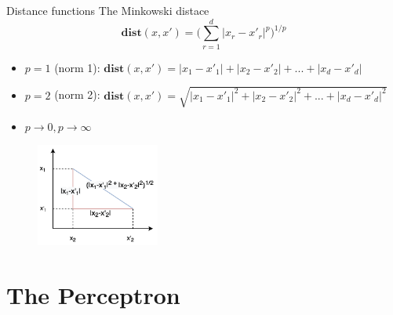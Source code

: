 \documentclass[aspectratio=1610]{beamer}
\begin{document}
\begin{frame}{Distance functions}
    The Minkowski distace
    $$\textbf{dist}(x,x') = \Bigg(\sum_{r=1}^{d}|x_r - x'_r|^p\Bigg)^{1/p}$$
  \begin{itemize}
      \item $p = 1$ (norm 1): $\textbf{dist}(x,x') = |x_1 - x'_1| + |x_2 - x'_2| + ... + |x_d - x'_d|$
      
      \item $p = 2$ (norm 2): $\textbf{dist}(x,x') = \sqrt{|x_1 - x'_1|^2 + |x_2 - x'_2|^2 + ... + |x_d - x'_d|^2}$
      \item $p\to 0, p\to\infty$
  \end{itemize}  
  \begin{figure}[h!]
  \includegraphics[width=0.36\textwidth]{Screen Shot 2022-05-21 at 16.33.12.png}
\end{figure}
  
  
\end{frame}

\section{The Perceptron}
\end{document}
